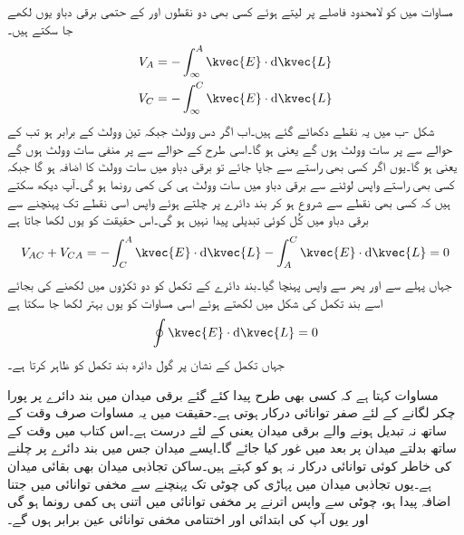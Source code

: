 مساوات  میں  کو لامحدود فاصلے پر لیتے ہوئے کسی بھی دو نقطوں  اور  کے حتمی برقی دباو یوں لکھے جا سکتے ہیں۔
\begin{align*}
V_A&=-\int_{\infty}^{A} \kvec{E} \cdot \dif \kvec{L}\\
V_C&=-\int_{\infty}^{C} \kvec{E} \cdot \dif \kvec{L}
\end{align*}
شکل -ب میں یہ نقطے دکھائے گئے ہیں۔اب اگر  دس وولٹ جبکہ  تین وولٹ کے برابر ہو تب  کے حوالے سے  پر سات وولٹ ہوں گے یعنی   ہو گا۔اسی طرح  کے حوالے سے  پر منفی سات وولٹ ہوں گے یعنی  ہو گا۔یوں اگر کسی بھی راستے   سے  جایا جائے تو برقی دباو میں سات وولٹ کا اضافہ ہو گا جبکہ کسی بھی راستے واپس  لوٹنے سے برقی دباو میں سات وولٹ ہی کی کمی رونما ہو گی۔آپ دیکھ سکتے ہیں کہ کسی بھی نقطے سے شروع ہو کر بند دائرے پر چلتے ہوئے واپس اسی نقطے تک پہنچنے سے برقی دباو میں کُل کوئی تبدیلی پیدا نہیں ہو گی۔اس حقیقت کو یوں لکھا جاتا ہے
\begin{align*}
V_{AC}+V_{CA}=-\int_{C}^{A} \kvec{E} \cdot \dif \kvec{L}-\int_{A}^{C} \kvec{E} \cdot \dif \kvec{L}=0
\end{align*}
جہاں پہلے  سے  اور پھر  سے واپس  پہنچا گیا۔بند دائرے کے تکمل کو دو ٹکڑوں میں لکھنے کی بجائے اسے بند تکمل کی شکل میں لکھتے ہوئے اسی مساوات کو یوں بہتر لکھا جا سکتا ہے 
\begin{align}\label{مساوات_توانائی_بند_راستہ}
\oint \kvec{E} \cdot \dif \kvec{L}=0
\end{align}
جہاں تکمل کے نشان پر گول دائرہ بند تکمل کو ظاہر کرتا ہے۔

مساوات  کہتا ہے کہ کسی بھی طرح پیدا کئے گئے برقی میدان میں بند دائرے پر پورا چکر لگانے کے لئے صفر توانائی درکار ہوتی ہے۔حقیقت میں یہ مساوات صرف وقت کے ساتھ نہ تبدیل ہونے والے برقی میدان یعنی   کے لئے درست ہے۔اس کتاب میں وقت کے ساتھ بدلتے میدان پر بعد میں غور کیا جائے گا۔ایسے میدان جس میں بند دائرے پر چلنے کی خاطر کوئی توانائی درکار نہ ہو کو  کہتے ہیں۔ساکن تجاذبی میدان بھی بقائی میدان ہے۔یوں تجاذبی میدان میں پہاڑی کی چوٹی تک پہنچنے سے مخفی توانائی میں جتنا اضافہ پیدا ہو، چوٹی سے واپس اترنے پر مخفی توانائی میں اتنی ہی کمی رونما ہو گی اور یوں آپ کی ابتدائی اور اختتامی مخفی توانائی عین برابر ہوں گے۔

